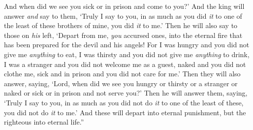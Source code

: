 \begin{biblechapter}
\verse And when did we see you sick or in prison and come to you?’
\verse And the king will answer \textit{and} say to them, ‘Truly I say to you, in as much as you did \textit{it} to one of the least of these brothers of mine, you did \textit{it} to me.’
\verse Then he will also say to those on \textit{his} left, ‘Depart from me, \textit{you} accursed ones, into the eternal fire that has been prepared for the devil and his angels!
\verse For I was hungry and you did not give me \textit{anything} to eat, I was thirsty and you did not give me \textit{anything} to drink,
\verse I was a stranger and you did not welcome me as a guest, naked and you did not clothe me, sick and in prison and you did not care for me.’
\verse Then they will also answer, saying, ‘Lord, when did we see you hungry or thirsty or a stranger or naked or sick or in prison and not serve you?’
\verse Then he will answer them, saying, ‘Truly I say to you, in as much as you did not do \textit{it} to one of the least of these, you did not do \textit{it} to me.’
\verse And these will depart into eternal punishment, but the righteous into eternal life.”
\end{biblechapter}

